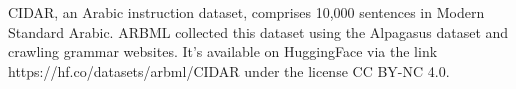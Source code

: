 CIDAR, an Arabic instruction dataset, comprises 10,000 sentences in Modern Standard Arabic. 
ARBML collected this dataset using the Alpagasus dataset and crawling grammar websites. 
It’s available on HuggingFace via the link https://hf.co/datasets/arbml/CIDAR under the license CC BY-NC 4.0.